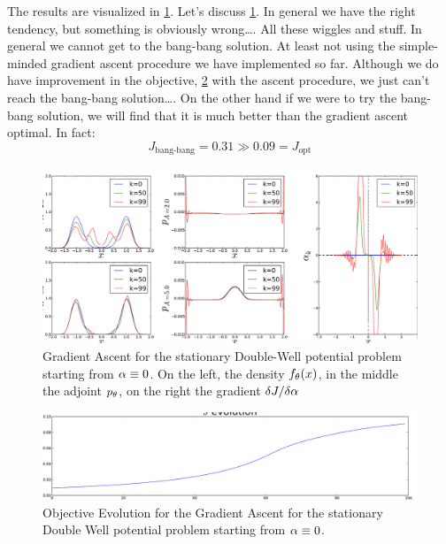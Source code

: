 \documentclass{article}
\begin{document}
The results are visualized in \cref{fig:FBSoln_doublewell_stationary_iterates}. Let's
discuss \cref{fig:FBSoln_doublewell_stationary_iterates}. In general we have
the right tendency, but something is obviously wrong\ldots. All these wiggles
and stuff. In general we cannot get to the bang-bang solution. At least not
using the simple-minded gradient ascent procedure we have implemented so far.  
Although we do have improvement in the objective,
\cref{fig:FBSoln_doublewell_stationary_objective_ascent} with the ascent
procedure, we just can't reach the bang-bang solution\ldots. On the other hand if we were
to try the bang-bang solution, we will find that it is much better than the
gradient ascent optimal. In fact:
$$
J_{\textrm{bang-bang}} =  0.31 \gg 0.09 = J_{\textrm{opt} } 
$$

\begin{figure}[htp]
\begin{center} 
  \includegraphics[width=\textwidth]{Figs/DoublewellFBStatinoary/FB_alpha_iterates_example.pdf}
  \caption[labelInTOC]{Gradient Ascent for the stationary Double-Well potential problem starting from ${\alpha} \equiv 0$. On the left, the density ${ f_{\theta}}(x)$, in the middle
  the adjoint ${ p_{\theta}}$, on the right the gradient $\delta J/ \delta {\alpha}$}
  \label{fig:FBSoln_doublewell_stationary_iterates}
\end{center}
\end{figure}
 
\begin{figure}[htp]
\begin{center} 
  \includegraphics[width=\textwidth]{Figs/DoublewellFBStatinoary/FB_J_iterates_example.pdf}
  \caption[labelInTOC]{Objective Evolution for the Gradient Ascent for the
  stationary Double Well potential problem starting from ${\alpha} \equiv 0$.}
  \label{fig:FBSoln_doublewell_stationary_objective_ascent}
\end{center}
\end{figure}
\end{document}
